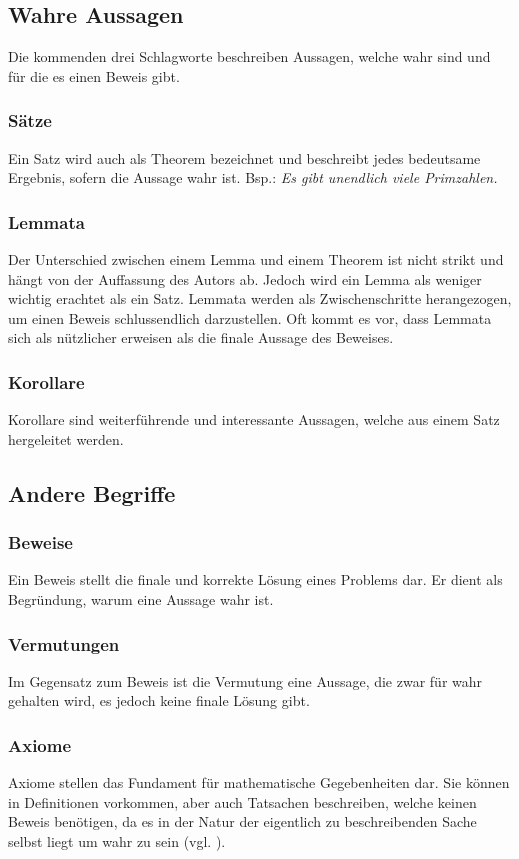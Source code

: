 \documentclass[12pt,a4paper]{article}
\theoremstyle{definition}
\begin{document}
\subsection*{Wahre Aussagen}
Die kommenden drei Schlagworte beschreiben Aussagen, welche wahr sind und für die es einen Beweis gibt.
\subsubsection*{Sätze}
Ein Satz wird auch als Theorem bezeichnet und beschreibt jedes bedeutsame Ergebnis, sofern die Aussage wahr ist.\newline
Bsp.: \textit{Es gibt unendlich viele Primzahlen.}
\subsubsection*{Lemmata}
Der Unterschied zwischen einem Lemma und einem Theorem ist nicht strikt und hängt von der Auffassung des Autors ab.
Jedoch wird ein Lemma als weniger wichtig erachtet als ein Satz.
Lemmata werden als Zwischenschritte herangezogen, um einen Beweis schlussendlich darzustellen.
Oft kommt es vor, dass Lemmata sich als nützlicher erweisen als die finale Aussage des Beweises.
\subsubsection*{Korollare}
Korollare sind weiterführende und interessante Aussagen, welche aus einem Satz hergeleitet werden.

\subsection*{Andere Begriffe}
\subsubsection*{Beweise}
Ein Beweis stellt die finale und korrekte Lösung eines Problems dar.
Er dient als Begründung, warum eine Aussage wahr ist.
\subsubsection*{Vermutungen}
Im Gegensatz zum Beweis ist die Vermutung eine Aussage, die zwar für wahr gehalten wird, es jedoch keine finale Lösung gibt.
\subsubsection*{Axiome}
Axiome stellen das Fundament für mathematische Gegebenheiten dar.
Sie können in Definitionen vorkommen, aber auch Tatsachen beschreiben, welche keinen Beweis benötigen, da es in der Natur der eigentlich zu beschreibenden Sache selbst liegt um wahr zu sein (vgl. \cite[119--122]{Houston2012}).
\newpage
\end{document}
